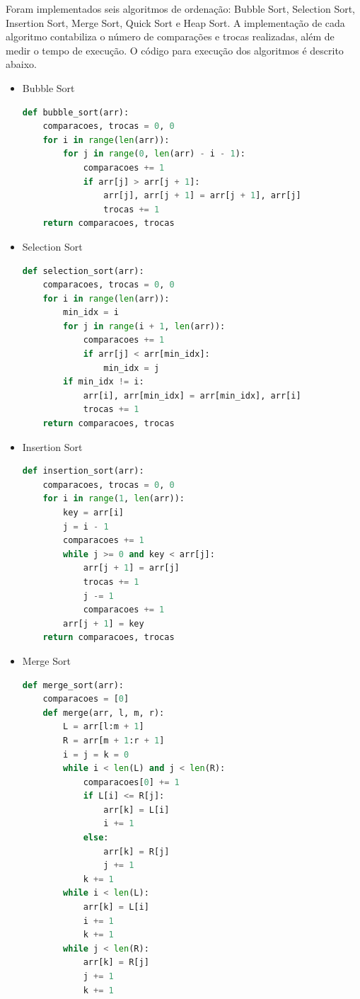 \documentclass[tcc2]{uftex}
\begin{document}
Foram implementados seis algoritmos de ordenação: Bubble Sort, Selection Sort, Insertion Sort, Merge Sort, Quick Sort e Heap Sort. A implementação de cada algoritmo contabiliza o número de comparações e trocas realizadas, além de medir o tempo de execução. O código para execução dos algoritmos é descrito abaixo.
\begin{itemize}


\item{Bubble Sort}

\begin{lstlisting}[language=python]
def bubble_sort(arr):
    comparacoes, trocas = 0, 0
    for i in range(len(arr)):
        for j in range(0, len(arr) - i - 1):
            comparacoes += 1
            if arr[j] > arr[j + 1]:
                arr[j], arr[j + 1] = arr[j + 1], arr[j]
                trocas += 1
    return comparacoes, trocas
\end{lstlisting}

\item{Selection Sort}


\begin{lstlisting}[language=python]
def selection_sort(arr):
    comparacoes, trocas = 0, 0
    for i in range(len(arr)):
        min_idx = i
        for j in range(i + 1, len(arr)):
            comparacoes += 1
            if arr[j] < arr[min_idx]:
                min_idx = j
        if min_idx != i:
            arr[i], arr[min_idx] = arr[min_idx], arr[i]
            trocas += 1
    return comparacoes, trocas

\end{lstlisting}

\item{Insertion Sort}


\begin{lstlisting}[language=python]
def insertion_sort(arr):
    comparacoes, trocas = 0, 0
    for i in range(1, len(arr)):
        key = arr[i]
        j = i - 1
        comparacoes += 1
        while j >= 0 and key < arr[j]:
            arr[j + 1] = arr[j]
            trocas += 1
            j -= 1
            comparacoes += 1
        arr[j + 1] = key
    return comparacoes, trocas

\end{lstlisting}


\item{Merge Sort}

\begin{lstlisting}[language=python]
def merge_sort(arr):
    comparacoes = [0]
    def merge(arr, l, m, r):
        L = arr[l:m + 1]
        R = arr[m + 1:r + 1]
        i = j = k = 0
        while i < len(L) and j < len(R):
            comparacoes[0] += 1
            if L[i] <= R[j]:
                arr[k] = L[i]
                i += 1
            else:
                arr[k] = R[j]
                j += 1
            k += 1
        while i < len(L):
            arr[k] = L[i]
            i += 1
            k += 1
        while j < len(R):
            arr[k] = R[j]
            j += 1
            k += 1


\end{lstlisting}
\end{itemize}
\end{document}
